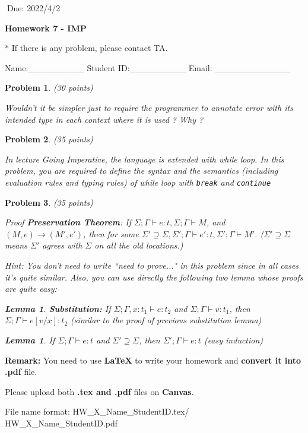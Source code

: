\documentclass[12pt]{article}
\newtheorem{lemma}[thm]{Lemma}
\newtheorem{hw}{Problem}
\begin{document}
$\;$\hfill Due: 2022/4/2

\begin{center}
{\LARGE\bf Homework 7 - IMP}
\end{center}

\begin{center}
	\footnotesize{\color{red}$*$ If there is any problem, please contact TA.}
	
	\footnotesize{\color{blue} \quad Name:\_\_\_\_\_\_\_\_\_  \quad Student ID:\_\_\_\_\_\_\_\_\_ \quad Email: \_\_\_\_\_\_\_\_\_\_\_\_}
\end{center}

\begin{hw}\rm (30 points)

	Wouldn't it be simpler just to require the programmer to annotate error with its intended type in each context where it is used ? Why ?
\end{hw}


\begin{hw} \rm (35 points)

  In lecture \emph{Going Imperative}, the language is extended with while loop.
	In this problem, you are required to define the syntax and the semantics
	(including evaluation rules and typing rules) of while loop with \texttt{break} and \texttt{continue}
\end{hw}

\begin{hw} \rm (35 points)

	Proof \textbf{Preservation Theorem}: If $\Sigma;\Gamma \vdash e:t, \Sigma;\Gamma \vdash M$, and $(M,e)\rightarrow(M',e')$, then for some $\Sigma' \supseteq \Sigma, \Sigma';\Gamma \vdash e':t, \Sigma';\Gamma \vdash M'$. ($\Sigma' \supseteq \Sigma$ means $\Sigma'$ agrees with $\Sigma$ on all the old locations.)
	
	Hint: You don't need to write ``need to prove..." in this problem since in all cases it's quite similar. Also, you can use directly the following two lemma whose proofs are quite easy:
	\begin{lemma}
	
	\textbf{Substitution:} If $\Sigma;\Gamma, x:t_1 \vdash e:t_2$ and $\Sigma;\Gamma \vdash v:t_1$, then $\Sigma;\Gamma \vdash e[v/x]:t_2$
	(similar to the proof of previous substitution lemma)
\end{lemma}

\begin{lemma}
	If $\Sigma;\Gamma \vdash e:t$ and $\Sigma' \supseteq \Sigma$, then $\Sigma';\Gamma \vdash e:t$
	(easy induction)
\end{lemma}
	
\end{hw}


\vspace{20pt}

\textbf{Remark:} 
You need to use \textbf{LaTeX} to write your homework and \textbf{convert it into .pdf} file.

Please upload both \textbf{.tex and .pdf} files on \textbf{Canvas}.

File name format: {\color{red} HW\_X\_Name\_StudentID.tex/\color{red} HW\_X\_Name\_StudentID.pdf}
\end{document}
